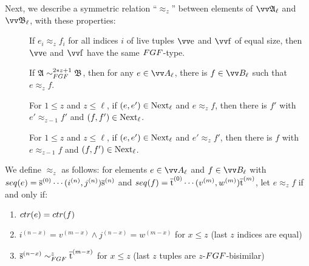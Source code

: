 Next, we describe a symmetric relation ``$\approx_{z}$'' between elements of $\unravel{A}_{\ell}$ and $\unravel{B}_{\ell}$, with these properties: 


\begin{description}
  \item[] If $e_{i} \approx_{z} f_{i}$ for all indices $i$ of live tuples $\elemtuptuplee$ and $\elemtuptuplef$ of equal size, then $\elemtuptuplee$ and $\elemtuptuplef$ have the same $\FGF$-type.
  \item[] If $\str{A} \bisimto_{\FGF}^{2*z + 1} \str{B}$, then for any $e \in \unraveldom{A}_{\ell}$, there is $f \in \unraveldom{B}_{\ell}$ such that $e \approx_{z} f$.
  \item[] For $1 \le z$ and $z \le \ell$, if $(e, e') \in \mathrm{Next}_{\ell}$ and $e \approx_{z} f$, then there is $f'$ with $e' \approx_{z-1} f'$ and $(f, f') \in \mathrm{Next}_{\ell}$.
  \item[] For $1 \le z$ and $z \le \ell$, if $(e, e') \in \mathrm{Next}_{\ell}$ and $e' \approx_{z} f'$, then there is $f$ with $e \approx_{z-1} f$ and $(f, f') \in \mathrm{Next}_{\ell}$.
\end{description}
We define $\approx_{z}$ as follows: for elements $e \in \unraveldom{A}_{\ell}$ and $f \in \unraveldom{B}_{\ell}$ with $\seq{e} = \elemtuples^{(0)}\cdots(i^{(n)}, j^{(n)})\elemtuples^{(n)}$ and $\seq{f} = \elemtuplet^{(0)}\cdots(v^{(m)}, w^{(m)})\elemtuplet^{(m)}$, let $e \approx_{z} f$ if and only if:
\begin{enumerate}
  \item $\ctr{e} = \ctr{f}$
  \item $i^{(n-x)} = v^{(m-x)} \wedge j^{(n-x)} = w^{(m-x)}$ for $x \le z$ (last $z$ indices are equal)
  \item $\elemtuples^{(n-x)} \bisimto_{\FGF}^{z} \elemtuplet^{(m-x)}$ for $x \le z$ (last $z$ tuples are $z$-$\FGF$-bisimilar)
\end{enumerate}
